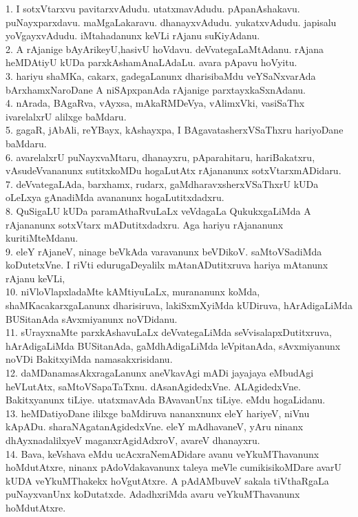 \documentclass{article}
\begin{document}
1. I sotxVtarxvu pavitarxvAdudu. utatxmavAdudu. pApanAshakavu. puNayxparxdavu. maMgaLakaravu. dhanayxvAdudu. yukatxvAdudu. japisalu yoVgayxvAdudu. iMtahadanunx keVLi rAjanu suKiyAdanu.\\
2. A rAjanige bAyArikeyU,hasivU hoVdavu. deVvategaLaMtAdanu. rAjana heMDAtiyU kUDa parxkAshamAnaLAdaLu. avara pApavu hoVyitu.\\
3. hariyu shaMKa, cakarx, gadegaLanunx dharisibaMdu veYSaNxvarAda bArxhamxNaroDane A niSApxpanAda rAjanige parxtayxkaSxnAdanu.\\
4. nArada, BAgaRva, vAyxsa, mAkaRMDeVya, vAlimxVki, vasiSaThx ivarelalxrU alilxge baMdaru.\\
5. gagaR, jAbAli, reYBayx, kAshayxpa, I BAgavatasherxVSaThxru hariyoDane baMdaru.\\
6. avarelalxrU puNayxvaMtaru, dhanayxru, pAparahitaru, hariBakatxru, vAsudeVvananunx sutitxkoMDu hogaLutAtx rAjananunx sotxVtarxmADidaru.\\
7. deVvategaLAda, barxhamx, rudarx, gaMdharavxsherxVSaThxrU kUDa oLeLxya gAnadiMda avananunx hogaLutitxdadxru.\\
8. QuSigaLU kUDa paramAthaRvuLaLx veVdagaLa QukukxgaLiMda A rAjananunx sotxVtarx mADutitxdadxru. Aga hariyu rAjananunx kuritiMteMdanu.\\
9. eleY rAjaneV, ninage beVkAda varavanunx beVDikoV. saMtoVSadiMda koDutetxVne. I riVti edurugaDeyalilx mAtanADutitxruva hariya mAtanunx rAjanu keVLi,\\
10. niVloVlapxladaMte kAMtiyuLaLx, murananunx koMda, shaMKacakarxgaLanunx dharisiruva, lakiSxmXyiMda kUDiruva, hArAdigaLiMda BUSitanAda sAvxmiyanunx noVDidanu.\\
11. sUrayxnaMte parxkAshavuLaLx deVvategaLiMda seVvisalapxDutitxruva, hArAdigaLiMda BUSitanAda, gaMdhAdigaLiMda leVpitanAda, sAvxmiyanunx noVDi BakitxyiMda namasakxrisidanu.\\
12. daMDanamasAkxragaLanunx aneVkavAgi mADi jayajaya eMbudAgi heVLutAtx, saMtoVSapaTaTxnu. dAsanAgidedxVne. ALAgidedxVne. Bakitxyanunx tiLiye. utatxmavAda BAvavanUnx tiLiye. eMdu hogaLidanu.\\
13. heMDatiyoDane ililxge baMdiruva nananxnunx eleY hariyeV, niVnu kApADu. sharaNAgatanAgidedxVne. eleY mAdhavaneV, yAru ninanx dhAyxnadalilxyeV maganxrAgidAdxroV, avareV dhanayxru.\\
14. Bava, keVshava eMdu ucAcxraNemADidare avanu veYkuMThavanunx hoMdutAtxre, ninanx pAdoVdakavanunx taleya meVle cumikisikoMDare avarU kUDA veYkuMThakekx hoVgutAtxre. A pAdAMbuveV sakala tiVthaRgaLa puNayxvanUnx koDutatxde. AdadhxriMda avaru veYkuMThavanunx hoMdutAtxre.\\
\end{document}
